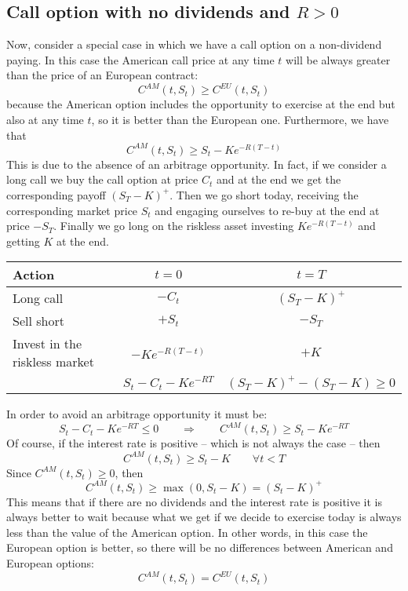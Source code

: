 \subsection{Call option with no dividends and $R>0$}
Now, consider a special case in which we have a call option on a non-dividend paying. In this case the American call price at any time $t$ will be always greater than the price of an European contract:
\begin{equation*}
    C^{AM}(t,S_t)\ge C^{EU}(t,S_t)
\end{equation*}
because the American option includes the opportunity to exercise at the end but also at any time $t$, so it is better than the European one. Furthermore, we have that
\begin{equation*}
    C^{AM}(t,S_t) \ge S_t - Ke^{-R(T-t)}
\end{equation*}
This is due to the absence of an arbitrage opportunity. In fact, if we consider a long call we buy the call option at price $C_t$ and at the end we get the corresponding payoff $(S_T-K)^+$. Then we go short today, receiving the corresponding market price $S_t$ and engaging ourselves to re-buy at the end at price $-S_T$. Finally we go long on the riskless asset investing $Ke^{-R(T-t)}$ and getting $K$ at the end.
\begin{center}
    \begin{tabular}{lcc}\toprule
        Action & $t=0$ & $t=T$ \\\midrule
        Long call & $-C_t$ & $(S_T-K)^+$ \\
        Sell short & $+S_t$ & $-S_T$ \\
        Invest in the riskless market & $-Ke^{-R(T-t)}$ & $+K$ \\ \midrule\midrule
         & $S_t-C_t-Ke^{-RT}$ & $(S_T-K)^+-(S_T-K)\ge 0$ \\\bottomrule
    \end{tabular}
\end{center}
In order to avoid an arbitrage opportunity it must be:
\begin{equation*}
    S_t-C_t-Ke^{-RT} \le 0 \qquad\Rightarrow\qquad C^{AM}(t,S_t)\ge S_t-Ke^{-RT}
\end{equation*}
Of course, if the interest rate is positive -- which is not always the case -- then 
\begin{equation*}
    C^{AM}(t,S_t) \ge S_t - K \qquad\forall t<T
\end{equation*}
Since $C^{AM}(t,S_t)\ge0$, then 
\begin{equation*}
    C^{AM}(t,S_t)\ge \max(0,S_t-K)=(S_t-K)^+
\end{equation*}
This means that if there are no dividends and the interest rate is positive it is always better to wait because what we get if we decide to exercise today is always less than the value of the American option. In other words, in this case the European option is better, so there will be no differences between American and European options:
\begin{equation*}
    C^{AM}(t,S_t)=C^{EU}(t,S_t)
\end{equation*}

